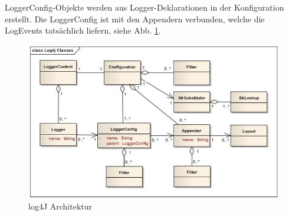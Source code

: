 LoggerConfig-Objekte werden aus Logger-Deklarationen in der Konfiguration erstellt. Die LoggerConfig ist mit den Appendern verbunden, welche die LogEvents tatsächlich liefern, siehe Abb. \ref{fig:impl:log4jArchitektur}. \cite{log4J}

\begin{figure}[h t]
    \centering
    \includegraphics[scale=0.7]{pics/log4jArchitektur.jpg}
    \caption{log4J Architektur \cite{log4J}}
    \label{fig:impl:log4jArchitektur}
\end{figure}